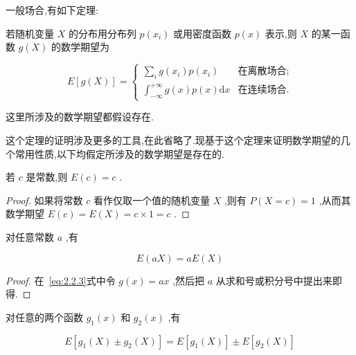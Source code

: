 一般场合,有如下定理:
\begin{theorem}{}{}
	若随机变量 $ X $ 的分布用分布列 $ p(x_i) $ 或用密度函数 $ p(x) $ 表示,则 $ X $ 的某一函数 $ g(X) $ 的数学期望为
	
	\begin{equation}
	E[g(X)]=\left\{\begin{array}{ll}
	{\sum_{i} g\left(x_{i}\right) p\left(x_{i}\right)}&{\text{在离散场合;}} \\ {\int_{-\infty}^{+\infty} g(x) p(x) \mathrm{d} x} &{\text{在连续场合.}} 
	\end{array}\right. \label{eq:2.2.3}
	\end{equation}
	
	这里所涉及的数学期望都假设存在.
	
	这个定理的证明涉及更多的工具,在此省略了.现基于这个定理来证明数学期望的几个常用性质,以下均假定所涉及的数学期望是存在的.
	
\end{theorem}

\begin{property}
	
	若 $ c $ 是常数,则 $ E(c)=c $ .
	
\end{property}

\begin{proof}
	如果将常数 $ c $ 看作仅取一个值的随机变量 $ X $ ,则有 $ P(X=c)=1 $ ,从而其数学期望 $ E(c)=E(X)=c \times 1=c $ .
\end{proof}

\begin{property}
	对任意常数 $ a $ ,有
	
	\begin{equation}
	E ( a X ) = a E ( X ) \label{eq:2.2.4}
	\end{equation}
	
\end{property}

\begin{proof}
	在~\ref{eq:2.2.3}式中令 $ g(x)=ax $ ,然后把 $ a $ 从求和号或积分号中提出来即得.
\end{proof}

\begin{property}
	对任意的两个函数 $ g_1(x) $ 和 $ g_2(x) $ ,有
	
	\begin{equation}
	E \left[ g _ { 1 } ( X ) \pm g _ { 2 } ( X ) \right] = E \left[ g _ { 1 } ( X ) \right] \pm E \left[ g _ { 2 } ( X ) \right] \label{eq:2.2.5}
	\end{equation}
	
\end{property}

